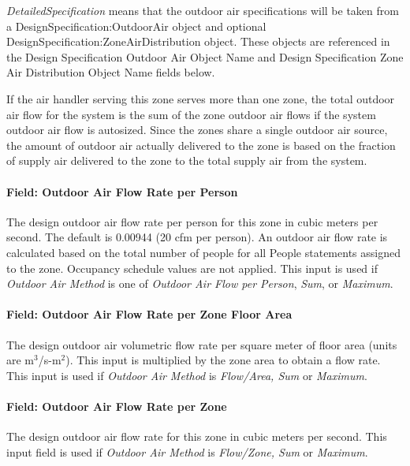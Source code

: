 \emph{DetailedSpecification} means that the outdoor air specifications will be taken from a DesignSpecification:OutdoorAir object and optional DesignSpecification:ZoneAirDistribution object. These objects are referenced in the Design Specification Outdoor Air Object Name and Design Specification Zone Air Distribution Object Name fields below.

If the air handler serving this zone serves more than one zone, the total outdoor air flow for the system is the sum of the zone outdoor air flows if the system outdoor air flow is autosized. Since the zones share a single outdoor air source, the amount of outdoor air actually delivered to the zone is based on the fraction of supply air delivered to the zone to the total supply air from the system.

\paragraph{Field: Outdoor Air Flow Rate per Person}\label{field-outdoor-air-flow-rate-per-person-12}

The design outdoor air flow rate per person for this zone in cubic meters per second. The default is 0.00944 (20 cfm per person). An outdoor air flow rate is calculated based on the total number of people for all People statements assigned to the zone. Occupancy schedule values are not applied. This input is used if \emph{Outdoor Air Method} is one of \emph{Outdoor Air Flow per Person}, \emph{Sum}, or \emph{Maximum}.

\paragraph{Field: Outdoor Air Flow Rate per Zone Floor Area}\label{field-outdoor-air-flow-rate-per-zone-floor-area-12}

The design outdoor air volumetric flow rate per square meter of floor area (units are m\(^{3}\)/s-m\(^{2}\)). This input is multiplied by the zone area to obtain a flow rate. This input is used if \emph{Outdoor Air Method} is \emph{Flow/Area, Sum} or \emph{Maximum}.

\paragraph{Field: Outdoor Air Flow Rate per Zone}\label{field-outdoor-air-flow-rate-per-zone-12}

The design outdoor air flow rate for this zone in cubic meters per second. This input field is used if \emph{Outdoor Air Method} is \emph{Flow/Zone, Sum} or \emph{Maximum}.

